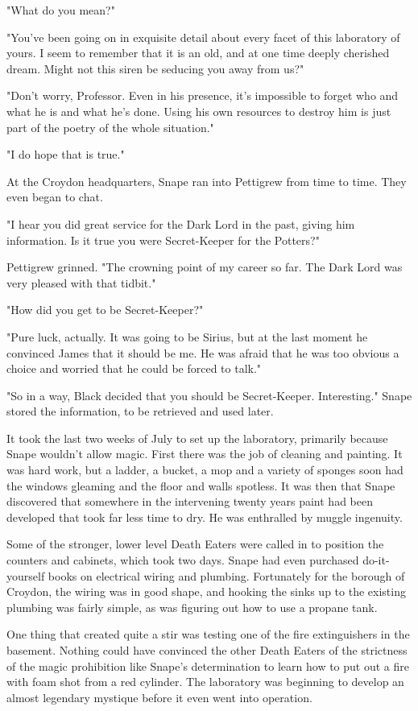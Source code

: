 "What do you mean?"

"You've been going on in exquisite detail about every facet of this laboratory of yours. I seem to remember that it is an old, and at one time deeply cherished dream. Might not this siren be seducing you away from us?"

"Don't worry, Professor. Even in his presence, it's impossible to forget who and what he is and what he's done. Using his own resources to destroy him is just part of the poetry of the whole situation."

"I do hope that is true."

At the Croydon headquarters, Snape ran into Pettigrew from time to time. They even began to chat.

"I hear you did great service for the Dark Lord in the past, giving him information. Is it true you were Secret-Keeper for the Potters?"

Pettigrew grinned. "The crowning point of my career so far. The Dark Lord was very pleased with that tidbit."

"How did you get to be Secret-Keeper?"

"Pure luck, actually. It was going to be Sirius, but at the last moment he convinced James that it should be me. He was afraid that he was too obvious a choice and worried that he could be forced to talk."

"So in a way, Black decided that you should be Secret-Keeper. Interesting." Snape stored the information, to be retrieved and used later.

It took the last two weeks of July to set up the laboratory, primarily because Snape wouldn't allow magic. First there was the job of cleaning and painting. It was hard work, but a ladder, a bucket, a mop and a variety of sponges soon had the windows gleaming and the floor and walls spotless. It was then that Snape discovered that somewhere in the intervening twenty years paint had been developed that took far less time to dry. He was enthralled by muggle ingenuity.

Some of the stronger, lower level Death Eaters were called in to position the counters and cabinets, which took two days. Snape had even purchased do-it-yourself books on electrical wiring and plumbing. Fortunately for the borough of Croydon, the wiring was in good shape, and hooking the sinks up to the existing plumbing was fairly simple, as was figuring out how to use a propane tank.

One thing that created quite a stir was testing one of the fire extinguishers in the basement. Nothing could have convinced the other Death Eaters of the strictness of the magic prohibition like Snape's determination to learn how to put out a fire with foam shot from a red cylinder. The laboratory was beginning to develop an almost legendary mystique before it even went into operation.

